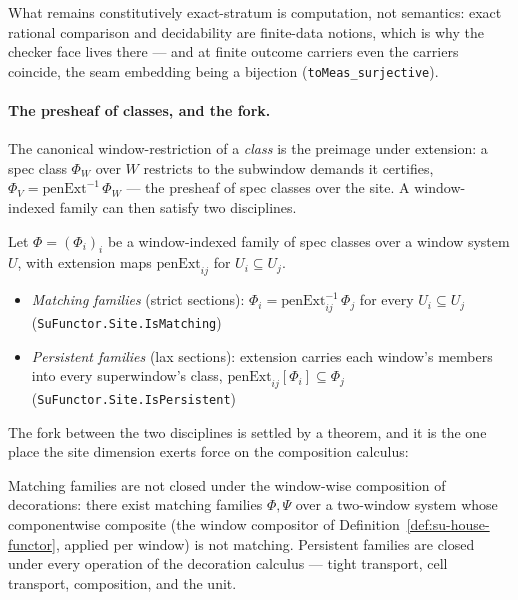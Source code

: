 \begin{remark}
What remains constitutively exact-stratum is computation, not
semantics: exact rational comparison and decidability are
finite-data notions, which is why the checker face lives there ---
and at finite outcome carriers even the carriers coincide, the seam
embedding being a bijection (\texttt{toMeas\_surjective}).
\end{remark}

\paragraph{The presheaf of classes, and the fork.} The canonical
window-restriction of a \emph{class} is the preimage under
extension: a spec class $\Phi_W$ over $W$ restricts to the subwindow
demands it certifies, $\Phi_V = \mathrm{penExt}^{-1}\,\Phi_W$ ---
the presheaf of spec classes over the site. A window-indexed family
can then satisfy two disciplines.

\begin{definition}
\label{def:su-matching-persistent}
Let $\Phi = (\Phi_i)_i$ be a window-indexed family of spec classes
over a window system $U$, with extension maps
$\mathrm{penExt}_{ij}$ for $U_i \subseteq U_j$.
\begin{itemize}
\item \emph{Matching families} (strict sections):
  $\Phi_i = \mathrm{penExt}_{ij}^{-1}\,\Phi_j$ for every
  $U_i \subseteq U_j$
  \hfill (\texttt{SuFunctor.Site.IsMatching})
\item \emph{Persistent families} (lax sections): extension carries
  each window's members into every superwindow's class,
  $\mathrm{penExt}_{ij}[\Phi_i] \subseteq \Phi_j$
  \hfill (\texttt{SuFunctor.Site.IsPersistent})
\end{itemize}
\end{definition}

The fork between the two disciplines is
settled by a theorem, and it is the one place the site dimension
exerts force on the composition calculus:

\begin{theorem}
\label{thm:su-matching-fork}
Matching families are not closed under the window-wise composition
of decorations: there exist matching families $\Phi, \Psi$ over a
two-window system whose componentwise composite (the window
compositor of Definition~\ref{def:su-house-functor}, applied per
window) is not matching. Persistent families are closed under every
operation of the decoration calculus --- tight transport, cell
transport, composition, and the unit.
\end{theorem}

